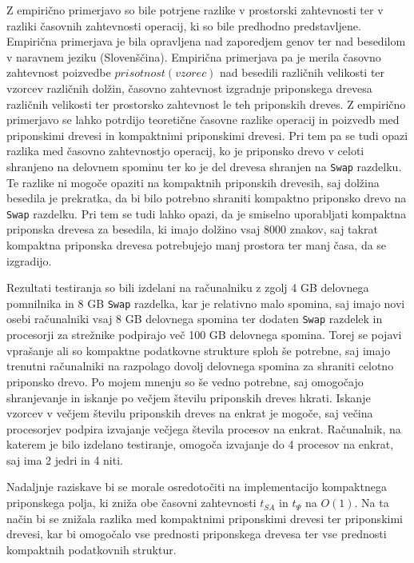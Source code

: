 Z empirično primerjavo so bile potrjene razlike v prostorski zahtevnosti ter v razliki časovnih zahtevnosti operacij, ki so bile predhodno predstavljene. Empirična primerjava je bila opravljena nad zaporedjem genov ter nad besedilom v naravnem jeziku (Slovenščina). Empirična primerjava pa je merila časovno zahtevnost poizvedbe $prisotnost(vzorec)$ nad besedili različnih velikosti ter vzorcev različnih dolžin, časovno zahtevnost izgradnje priponskega drevesa različnih velikosti ter prostorsko zahtevnost le teh priponskih dreves. Z empirično primerjavo se lahko potrdijo teoretične časovne razlike operacij in poizvedb med priponskimi drevesi in kompaktnimi priponskimi drevesi. Pri tem pa se tudi opazi razlika med časovno zahtevnostjo operacij, ko je priponsko drevo v celoti shranjeno na delovnem spominu ter ko je del drevesa shranjen na \verb|Swap| razdelku. Te razlike ni mogoče opaziti na kompaktnih priponskih drevesih, saj dolžina besedila je prekratka, da bi bilo potrebno shraniti kompaktno priponsko drevo na \verb|Swap| razdelku. Pri tem se tudi lahko opazi, da je smiselno uporabljati kompaktna priponska drevesa za besedila, ki imajo dolžino vsaj 8000 znakov, saj takrat kompaktna priponska drevesa potrebujejo manj prostora ter manj časa, da se izgradijo. 

Rezultati testiranja so bili izdelani na računalniku z zgolj 4 GB delovnega pomnilnika in 8 GB \verb|Swap| razdelka, kar je relativno malo spomina, saj imajo novi osebi računalniki vsaj 8 GB delovnega spomina ter dodaten \verb|Swap| razdelek in procesorji za strežnike podpirajo več 100 GB delovnega spomina. Torej se pojavi vprašanje ali so kompaktne podatkovne strukture sploh še potrebne, saj imajo trenutni računalniki na razpolago dovolj delovnega spomina za shraniti celotno priponsko drevo. 
Po mojem mnenju so še vedno potrebne, saj omogočajo shranjevanje in iskanje po večjem številu priponskih dreves hkrati. Iskanje vzorcev v večjem številu priponskih dreves na enkrat je mogoče, saj večina procesorjev podpira izvajanje večjega števila procesov na enkrat. Računalnik, na katerem je bilo izdelano testiranje, omogoča izvajanje do 4 procesov na enkrat, saj ima 2 jedri in 4 niti.

Nadaljnje raziskave bi se morale osredotočiti na implementacijo kompaktnega priponskega polja, ki zniža obe časovni zahtevnosti $t_{SA}$ in $t_\Psi$ na $O(1)$. Na ta način bi se znižala razlika med kompaktnimi priponskimi drevesi ter priponskimi drevesi, kar bi omogočalo vse prednosti priponskega drevesa ter vse prednosti kompaktnih podatkovnih struktur.